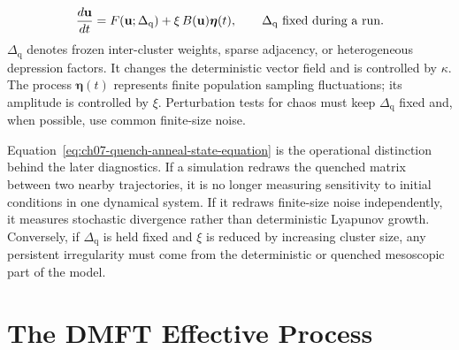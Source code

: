 \begin{keyequation}
\begin{equation}
        \frac{d\mathbf u}{dt}
        =
        F(\mathbf u;\Delta_{\mathrm{q}})
        +
        \xi\,B(\mathbf u)\boldsymbol\eta(t),
        \qquad
        \Delta_{\mathrm{q}}\hbox{ fixed during a run.}
        \label{eq:ch07-quench-anneal-state-equation}
\end{equation}
\tcblower%
\(\Delta_{\mathrm{q}}\) denotes frozen inter-cluster weights, sparse adjacency,
or heterogeneous depression factors. It changes the deterministic vector field
and is controlled by \(\kappa\). The process \(\boldsymbol\eta(t)\) represents
finite population sampling fluctuations; its amplitude is controlled by
\(\xi\). Perturbation tests for chaos must keep \(\Delta_{\mathrm{q}}\) fixed
and, when possible, use common finite-size noise.
\end{keyequation}

Equation~\eqref{eq:ch07-quench-anneal-state-equation} is the operational
distinction behind the later diagnostics. If a simulation redraws the quenched
matrix between two nearby trajectories, it is no longer measuring sensitivity
to initial conditions in one dynamical system. If it redraws finite-size noise
independently, it measures stochastic divergence rather than deterministic
Lyapunov growth. Conversely, if \(\Delta_{\mathrm{q}}\) is held fixed and
\(\xi\) is reduced by increasing cluster size, any persistent irregularity must
come from the deterministic or quenched mesoscopic part of the model.

\section{The DMFT Effective Process}
\label{sec:ch07-effective-process}

